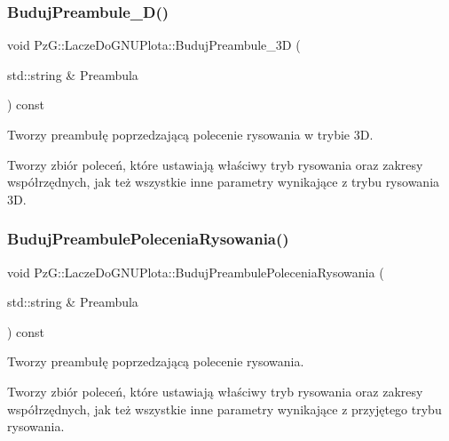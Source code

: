 \subsubsection{\texorpdfstring{Buduj\+Preambule\+\_\+D()}{BudujPreambule\_3D()}}
{\footnotesize\ttfamily void Pz\+G\+::\+Lacze\+Do\+G\+N\+U\+Plota\+::\+Buduj\+Preambule\+\_\+3D (\begin{DoxyParamCaption}\item[{std\+::string \&}]{Preambula }\end{DoxyParamCaption}) const\hspace{0.3cm}{\ttfamily [protected]}}



Tworzy preambułę poprzedzającą polecenie rysowania w trybie 3D. 

Tworzy zbiór poleceń, które ustawiają właściwy tryb rysowania oraz zakresy współrzędnych, jak też wszystkie inne parametry wynikające z trybu rysowania 3D. \mbox{\label{classPzG_1_1LaczeDoGNUPlota_a0da98f68f533070d5a32adbdb519cf56}} 
\subsubsection{\texorpdfstring{Buduj\+Preambule\+Polecenia\+Rysowania()}{BudujPreambulePoleceniaRysowania()}}
{\footnotesize\ttfamily void Pz\+G\+::\+Lacze\+Do\+G\+N\+U\+Plota\+::\+Buduj\+Preambule\+Polecenia\+Rysowania (\begin{DoxyParamCaption}\item[{std\+::string \&}]{Preambula }\end{DoxyParamCaption}) const\hspace{0.3cm}{\ttfamily [protected]}}



Tworzy preambułę poprzedzającą polecenie rysowania. 

Tworzy zbiór poleceń, które ustawiają właściwy tryb rysowania oraz zakresy współrzędnych, jak też wszystkie inne parametry wynikające z przyjętego trybu rysowania. \mbox{\label{classPzG_1_1LaczeDoGNUPlota_af8be8aeb3b1b524fab67d4411cba5b9e}} 

